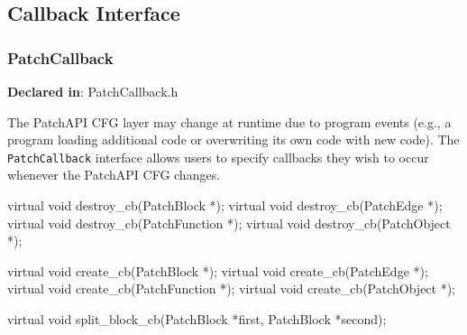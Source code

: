 \subsection{Callback Interface}
\label{sec-3.1}


\subsubsection{PatchCallback}
\label{sec-3.2.7}

\textbf{Declared in}: PatchCallback.h

The PatchAPI CFG layer may change at runtime due to program events
(e.g., a program loading additional code or overwriting its own code
with new code). The \texttt{PatchCallback} interface allows users to
specify callbacks they wish to occur whenever the PatchAPI CFG
changes.

\begin{apient}
virtual void destroy_cb(PatchBlock *);
virtual void destroy_cb(PatchEdge *);
virtual void destroy_cb(PatchFunction *);
virtual void destroy_cb(PatchObject *);
\end{apient}



\begin{apient}
virtual void create_cb(PatchBlock *);
virtual void create_cb(PatchEdge *);
virtual void create_cb(PatchFunction *);
virtual void create_cb(PatchObject *);
\end{apient}



\begin{apient}
virtual void split_block_cb(PatchBlock *first, PatchBlock *second);
\end{apient}



